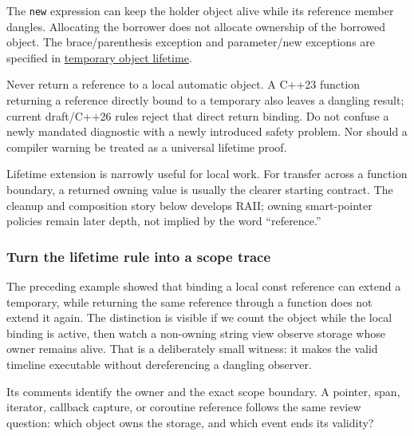 The \texttt{new} expression can keep the holder object alive while its reference member dangles. Allocating the borrower does not allocate ownership of the borrowed object. The brace/parenthesis exception and parameter/new exceptions are specified in \href{https://eel.is/c++draft/class.temporary}{temporary object lifetime}.

Never return a reference to a local automatic object. A C++23 function returning a reference directly bound to a temporary also leaves a dangling result; current draft/C++26 rules reject that direct return binding. Do not confuse a newly mandated diagnostic with a newly introduced safety problem. Nor should a compiler warning be treated as a universal lifetime proof.

Lifetime extension is narrowly useful for local work. For transfer across a function boundary, a returned owning value is usually the clearer starting contract. The cleanup and composition story below develops RAII; owning smart-pointer policies remain later depth, not implied by the word ``reference.''

\subsubsection{Turn the lifetime rule into a scope trace}\label{01-foundations-i-ch003-turn-the-lifetime-rule-into-a-scope-trace}

\hypertarget{01-foundations-i-ch003-turn-the-lifetime-rule-into-a-scope-trace}{}

The preceding example showed that binding a local const reference can extend a temporary, while returning the same reference through a function does not extend it again. The distinction is visible if we count the object while the local binding is active, then watch a non-owning string view observe storage whose owner remains alive. That is a deliberately small witness: it makes the valid timeline executable without dereferencing a dangling observer.

Its comments identify the owner and the exact scope boundary. A pointer, span, iterator, callback capture, or coroutine reference follows the same review question: which object owns the storage, and which event ends its validity?

